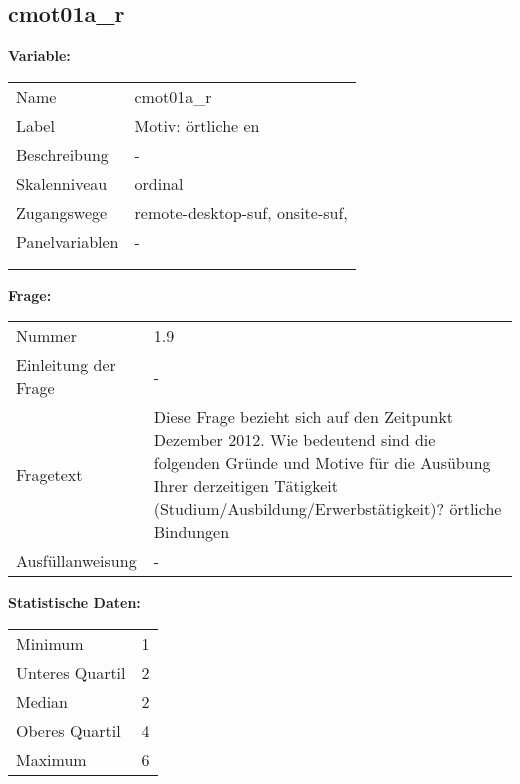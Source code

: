 	
	
	\subsection{cmot01a\_r}
	\label{subSection:cmot01a_r}

	\noindent\textbf{Variable:}\\
		\begin{tabular}{lL{11.3cm}}
			\label{tableVariable:cmot01a_r}
			Name & cmot01a\_r \\
			Label & Motiv: örtliche en \\
			Beschreibung & - \\
			Skalenniveau & ordinal \\
			Zugangswege &
				remote-desktop-suf,
				onsite-suf,
 \\
			Panelvariablen & -
			 \\
			 \\
 \\
		\end{tabular}

		\vspace*{1 cm}
		\noindent\textbf{Frage:}\\
		\begin{tabular}{lL{11.3cm}}
			\label{tableQuestion:cmot01a_r}
			Nummer & 1.9 \\
			Einleitung der Frage & - \\
			Fragetext & Diese Frage bezieht sich auf den Zeitpunkt Dezember 2012. Wie bedeutend sind die folgenden Gründe und Motive für die Ausübung Ihrer derzeitigen Tätigkeit (Studium/Ausbildung/Erwerbstätigkeit)?
örtliche Bindungen \\
			Ausfüllanweisung & - \\
		\end{tabular}


		\vspace*{1 cm}
		\noindent\textbf{Statistische Daten:}\\
			\begin{tabular}{ll}
				\label{tableStatistics:cmot01a_r}
					Minimum & 1 \\
					Unteres Quartil & 2 \\
					Median & 2 \\
					Oberes Quartil & 4 \\
					Maximum & 6 \\
			\end{tabular}



